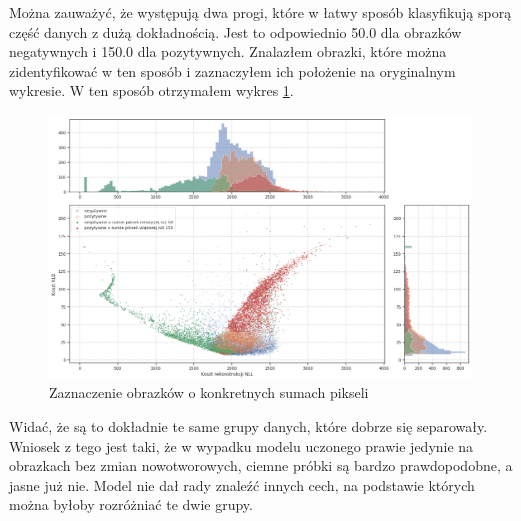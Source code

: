 Można zauważyć, że występują dwa progi, które w łatwy sposób klasyfikują sporą część danych z dużą dokładnością. Jest to odpowiednio 50.0 dla obrazków negatywnych i 150.0 dla pozytywnych. Znalazłem obrazki, które można zidentyfikować w ten sposób i zaznaczyłem ich położenie na oryginalnym wykresie. W ten sposób otrzymałem wykres \ref{fig:soft_vae_th}.

\begin{figure}[h!]
    \centering
    \includegraphics[width=1.0\textwidth]{images/soft_vae_th_v2}
    \caption{Zaznaczenie obrazków o konkretnych sumach pikseli}
    \label{fig:soft_vae_th}
\end{figure}

Widać, że są to dokładnie te same grupy danych, które dobrze się separowały. Wniosek z tego jest taki, że w wypadku modelu uczonego prawie jedynie na obrazkach bez zmian nowotworowych, ciemne próbki są bardzo prawdopodobne, a jasne już nie. Model nie dał rady znaleźć innych cech, na podstawie których można byłoby rozróżniać te dwie grupy.





